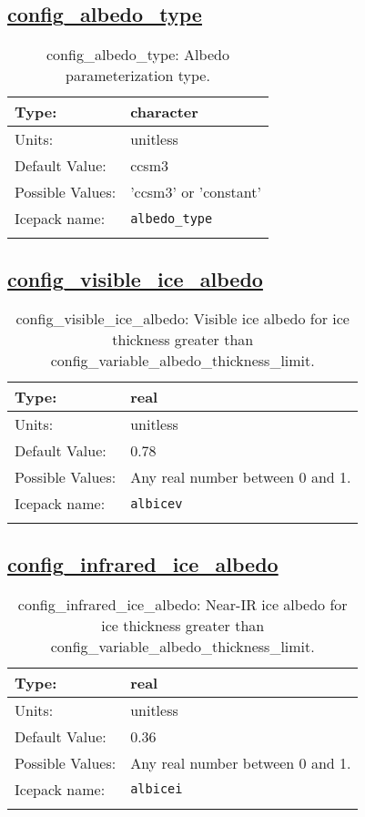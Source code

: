 \subsection[config\_albedo\_type]{\hyperref[sec:nm_tab_shortwave]{config\_albedo\_type}}
\label{subsec:nm_sec_config_albedo_type}
\begin{center}
\begin{longtable}{| p{2.0in} || p{4.0in} |}
    \hline
    Type: & character \\
    \hline
    Units: & \si{unitless} \\
    \hline
    Default Value: & ccsm3 \\
    \hline
    Possible Values: & 'ccsm3' or 'constant' \\
    \hline
    \hline
    Icepack name: & \verb+albedo_type+ \\
    \caption{config\_albedo\_type: Albedo parameterization type.}
\end{longtable}
\end{center}
\subsection[config\_visible\_ice\_albedo]{\hyperref[sec:nm_tab_shortwave]{config\_visible\_ice\_albedo}}
\label{subsec:nm_sec_config_visible_ice_albedo}
\begin{center}
\begin{longtable}{| p{2.0in} || p{4.0in} |}
    \hline
    Type: & real \\
    \hline
    Units: & \si{unitless} \\
    \hline
    Default Value: & 0.78 \\
    \hline
    Possible Values: & Any real number between 0 and 1. \\
    \hline
    \hline
    Icepack name: & \verb+albicev+ \\
    \caption{config\_visible\_ice\_albedo: Visible ice albedo for ice thickness greater than config\_variable\_albedo\_thickness\_limit.}
\end{longtable}
\end{center}
\subsection[config\_infrared\_ice\_albedo]{\hyperref[sec:nm_tab_shortwave]{config\_infrared\_ice\_albedo}}
\label{subsec:nm_sec_config_infrared_ice_albedo}
\begin{center}
\begin{longtable}{| p{2.0in} || p{4.0in} |}
    \hline
    Type: & real \\
    \hline
    Units: & \si{unitless} \\
    \hline
    Default Value: & 0.36 \\
    \hline
    Possible Values: & Any real number between 0 and 1. \\
    \hline
    \hline
    Icepack name: & \verb+albicei+ \\
    \caption{config\_infrared\_ice\_albedo: Near-IR ice albedo for ice thickness greater than config\_variable\_albedo\_thickness\_limit.}
\end{longtable}
\end{center}
